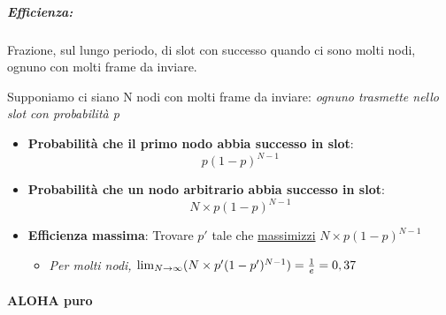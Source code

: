 \documentclass[12pt]{article}
\begin{document}
    \subparagraph{Efficienza:} Frazione, sul lungo periodo, di slot con successo quando ci sono molti nodi, ognuno con molti frame da inviare.
    
    Supponiamo ci siano N nodi con molti frame da inviare: \textit{ognuno trasmette nello slot con probabilità p}
    \begin{itemize}
        \item \textbf{Probabilità che il primo nodo abbia successo in slot}: $$p(1-p)^{N-1}$$
        \item \textbf{Probabilità che un nodo arbitrario abbia successo in slot}: $$N \times p(1-p)^{N-1}$$
        \item \textbf{Efficienza massima}: Trovare \textit{$p'$} tale che \underline{massimizzi} $N \times p(1-p)^{N-1}$
        \begin{itemize}
            \item \textit{Per molti nodi, $\lim_{N\to\infty} (N \times p'(1-p')^{N-1}) = {1 \over e} = 0,37$}
        \end{itemize}        
    \end{itemize}
    \pagebreak
    \paragraph{ALOHA puro}
\end{document}
